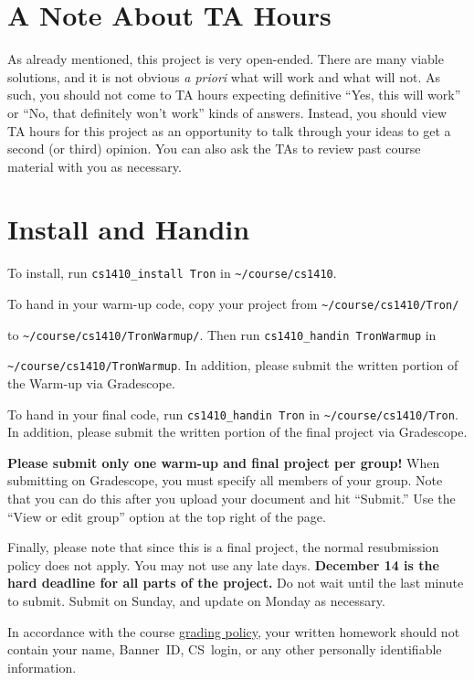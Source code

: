 \documentclass{article}
\begin{document}
\section{A Note About TA Hours}
As already mentioned, this project is very open-ended.  There are many
viable solutions, and it is not obvious \emph{a priori\/} what will
work and what will not.  As such, you should not come to TA hours
expecting definitive ``Yes, this will work'' or ``No, that definitely
won't work'' kinds of answers.  Instead, you should view TA hours for
this project as an opportunity to talk through your ideas to get a
second (or third) opinion.  You can also ask the TAs to review past
course material with you as necessary.


\section{Install and Handin}
To install, run \verb|cs1410_install Tron| in \verb|~/course/cs1410|.

To hand in your warm-up code,
copy your project from \verb|~/course/cs1410/Tron/| 

\noindent to \verb|~/course/cs1410/TronWarmup/|.
Then run \verb|cs1410_handin TronWarmup| in

\noindent \verb|~/course/cs1410/TronWarmup|.
In addition, please submit the written portion of the Warm-up via Gradescope.

To hand in your final code, run \verb|cs1410_handin Tron| in \verb|~/course/cs1410/Tron|.
In addition, please submit the written portion of the final project via Gradescope.


\textbf{Please submit only one warm-up and final project per group!}
When submitting on Gradescope, you must specify all members of your
group.  Note that you can do this after you upload your document and
hit ``Submit.''  Use the ``View or edit group'' option at the top
right of the page.

Finally, please note that since this is a final project,
the normal resubmission policy does not apply.
You may not use any late days.
\textbf{December 14 is the hard deadline for all parts of the project.}
Do not wait until the last minute to submit.
Submit on Sunday, and update on Monday as necessary.

In accordance with the course \href{https://forms.gle/DqfbBY8jdaqenRoa9}{grading policy}, your
written homework should not contain your name, Banner~ID, CS~login, or any other personally
identifiable information.
\end{document}
